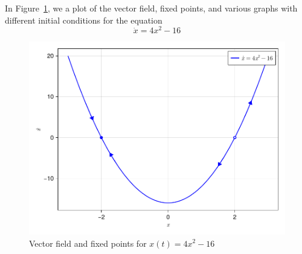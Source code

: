 
In Figure~\ref{fig2_2_1vecfield}, we a plot of the vector field, fixed points,
and various graphs with different initial conditions for the equation 
\[
    \dot{x} = 4x^2 - 16
\]
\begin{figure}[!ht]
    \includegraphics[scale=0.6, center]{../plots/ch02/ex2_2_1.pdf}
    \caption{Vector field and fixed points for $x(t) = 4x^2 - 16$\label{fig2_2_1vecfield}}
\end{figure}
